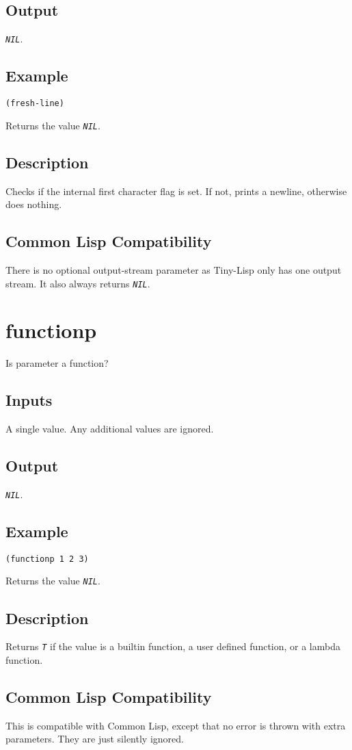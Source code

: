\documentclass[10pt, openany]{book}
\newcommand{\constant}[1]{\emph{\texttt{#1}}}
\newcommand{\tl}{Tiny-Lisp}
\newcommand{\cl}{Common Lisp}
\begin{document}
\subsection{Output}
\constant{NIL}.
\subsection{Example}
\begin{lstlisting}
(fresh-line)
\end{lstlisting}
Returns the value \constant{NIL}.
\subsection{Description}
Checks if the internal first character flag is set.  If not, prints a newline, otherwise does nothing.
\subsection{Common Lisp Compatibility}
There is no optional output-stream parameter as \tl{} only has one output stream.  It also always returns \constant{NIL}.

\section{functionp}
Is parameter a function?
\subsection{Inputs}
A single value.  Any additional values are ignored.
\subsection{Output}
\constant{NIL}.
\subsection{Example}
\begin{lstlisting}
(functionp 1 2 3)
\end{lstlisting}
Returns the value \constant{NIL}.
\subsection{Description}
Returns \constant{T} if the value is a builtin function, a user defined function, or a lambda function.
\subsection{Common Lisp Compatibility}
This is compatible with \cl, except that no error is thrown with extra parameters.  They are just silently ignored.
\end{document}
